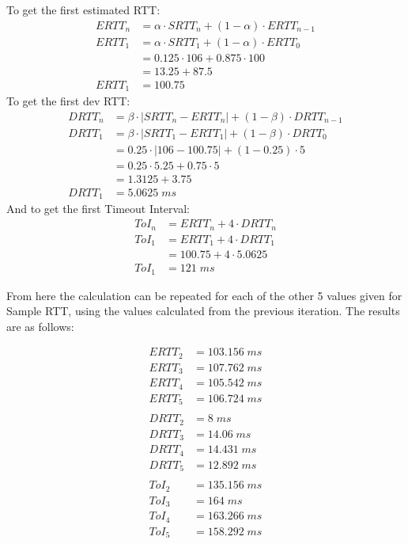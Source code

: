 \documentclass[12pt]{report}
\begin{document}
\noindent
To get the first estimated RTT:
\begin{align*}
ERTT_n &= \alpha \cdot SRTT_n + (1-\alpha)\cdot ERTT_{n-1}\\
ERTT_1 &= \alpha \cdot SRTT_1 + (1-\alpha)\cdot ERTT_0\\
&= 0.125 \cdot 106 + 0.875 \cdot 100\\
&= 13.25 + 87.5\\
ERTT_1 &= \boxed{100.75}
\end{align*}
\noindent
To get the first dev RTT:
\begin{align*}
DRTT_n &= \beta \cdot \lvert SRTT_n - ERTT_n \rvert + (1-\beta) \cdot DRTT_{n-1} \\
DRTT_1 &= \beta \cdot \lvert SRTT_1 - ERTT_1 \rvert + (1-\beta) \cdot DRTT_0 \\
&= 0.25 \cdot \lvert 106 - 100.75 \rvert + (1 - 0.25) \cdot 5 \\
&= 0.25 \cdot 5.25 + 0.75 \cdot 5 \\
&= 1.3125 + 3.75\\
DRTT_1 &= \boxed{5.0625\;ms} 
\end{align*}
\noindent
And to get the first Timeout Interval:
\begin{align*}
ToI_n &= ERTT_n + 4 \cdot DRTT_n\\
ToI_1 &= ERTT_1 + 4 \cdot DRTT_1\\
&= 100.75 + 4 \cdot 5.0625\\
ToI_1 &= \boxed{121\;ms}
\end{align*}

\noindent{}From here the calculation can be repeated for each of the other 5 values given for Sample RTT, using the values calculated from the previous iteration. The results are as follows: 

\begin{align*}
ERTT_2 &= 103.156\;ms \\
ERTT_3 &= 107.762\;ms \\
ERTT_4 &= 105.542\;ms \\
ERTT_5 &= 106.724\;ms \\\\
DRTT_2 &= 8\;ms \\
DRTT_3 &= 14.06\;ms \\
DRTT_4 &= 14.431\;ms \\
DRTT_5 &= 12.892\;ms \\\\
ToI_2 &= 135.156\;ms \\
ToI_3 &= 164\;ms \\
ToI_4 &= 163.266\;ms \\
ToI_5 &= 158.292\;ms 
\end{align*}
\end{document}
